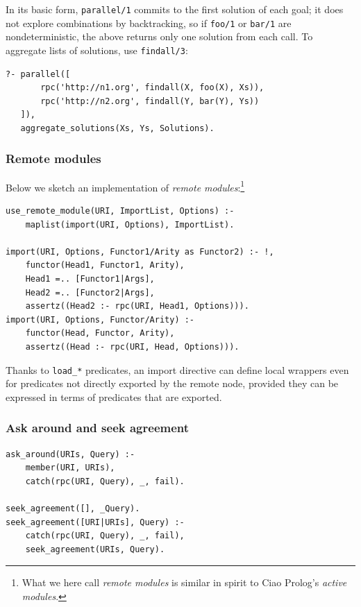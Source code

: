 In its basic form, \texttt{parallel/1} commits to the first solution of each goal; it does not explore combinations by backtracking, so if \texttt{foo/1} or \texttt{bar/1} are nondeterministic, the above returns only one solution from each call. To aggregate lists of solutions, use \texttt{findall/3}:

\begin{verbatim}
?- parallel([
       rpc('http://n1.org', findall(X, foo(X), Xs)),
       rpc('http://n2.org', findall(Y, bar(Y), Ys))
   ]),
   aggregate_solutions(Xs, Ys, Solutions).
\end{verbatim}

\subsubsection{Remote modules}\label{sec:remote-modules}

Below we sketch an implementation of \emph{remote modules}:\footnote{What we here call \emph{remote modules} is similar in spirit to Ciao Prolog's \emph{active modules}.}

\begin{verbatim}
use_remote_module(URI, ImportList, Options) :-
    maplist(import(URI, Options), ImportList).

import(URI, Options, Functor1/Arity as Functor2) :- !,
    functor(Head1, Functor1, Arity),
    Head1 =.. [Functor1|Args],
    Head2 =.. [Functor2|Args],
    assertz((Head2 :- rpc(URI, Head1, Options))).
import(URI, Options, Functor/Arity) :-
    functor(Head, Functor, Arity),
    assertz((Head :- rpc(URI, Head, Options))).
\end{verbatim}

\noindent Thanks to \texttt{load\_*} predicates, an import directive can define local wrappers even for predicates not directly exported by the remote node, provided they can be expressed in terms of predicates that are exported. 

\subsubsection{Ask around and seek agreement}\label{sec:other}

\begin{verbatim}
ask_around(URIs, Query) :-
    member(URI, URIs),
    catch(rpc(URI, Query), _, fail).

seek_agreement([], _Query).
seek_agreement([URI|URIs], Query) :-
    catch(rpc(URI, Query), _, fail),
    seek_agreement(URIs, Query).
\end{verbatim}



